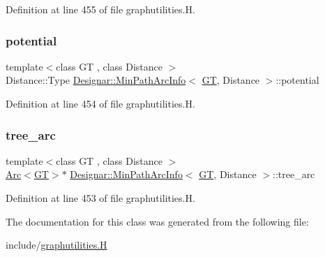 Definition at line 455 of file graphutilities.\+H.

\mbox{\label{class_designar_1_1_min_path_arc_info_ae53cddd12f7488ab3daf3711963b533d}} 
\subsubsection{\texorpdfstring{potential}{potential}}
{\footnotesize\ttfamily template$<$class GT , class Distance $>$ \\
Distance\+::\+Type \hyperlink{class_designar_1_1_min_path_arc_info}{Designar\+::\+Min\+Path\+Arc\+Info}$<$ \hyperlink{demo-buildgraph_8_c_a3001c40d2c31ca87ed96cd7d1334a55e}{GT}, Distance $>$\+::potential}



Definition at line 454 of file graphutilities.\+H.

\mbox{\label{class_designar_1_1_min_path_arc_info_a2f5c165e547c75ec582dd3724a93137c}} 
\subsubsection{\texorpdfstring{tree\+\_\+arc}{tree\_arc}}
{\footnotesize\ttfamily template$<$class GT , class Distance $>$ \\
\hyperlink{namespace_designar_a3f55fb5513d62ff47cbc8f72b8e95d6f}{Arc}$<$\hyperlink{demo-buildgraph_8_c_a3001c40d2c31ca87ed96cd7d1334a55e}{GT}$>$$\ast$ \hyperlink{class_designar_1_1_min_path_arc_info}{Designar\+::\+Min\+Path\+Arc\+Info}$<$ \hyperlink{demo-buildgraph_8_c_a3001c40d2c31ca87ed96cd7d1334a55e}{GT}, Distance $>$\+::tree\+\_\+arc}



Definition at line 453 of file graphutilities.\+H.



The documentation for this class was generated from the following file\+:\begin{DoxyCompactItemize}
\item 
include/\hyperlink{graphutilities_8_h}{graphutilities.\+H}\end{DoxyCompactItemize}
